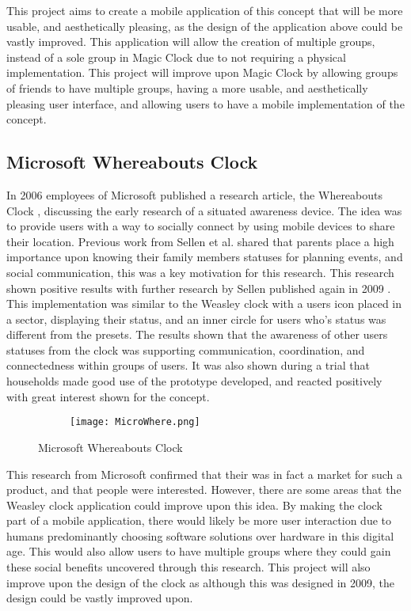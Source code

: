 This project aims to create a mobile application of this concept that will be more usable, and aesthetically pleasing, as the design of the application above could be vastly improved. This application will allow the creation of multiple groups, instead of a sole group in Magic Clock due to not requiring a physical implementation. This project will improve upon Magic Clock by allowing groups of friends to have multiple groups, having a more usable, and aesthetically pleasing user interface, and allowing users to have a mobile implementation of the concept.

\subsection{Microsoft Whereabouts Clock}

In 2006 employees of Microsoft published a research article, the Whereabouts Clock \cite{micrWher}, discussing  the early research of a situated awareness device. The idea was to provide users with a way to socially connect by using mobile devices to share their location. Previous work from Sellen et al. \cite{sellen} shared that parents place a high importance upon knowing their family members statuses for planning events, and social communication, this was a key motivation for this research. This research shown positive results with further research by Sellen published again in 2009 \cite{sellen2009}. This implementation was similar to the Weasley clock with a users icon placed in a sector, displaying their status, and an inner circle for users who's status was different from the presets. The results shown that the awareness of other users statuses from the clock was supporting communication, coordination, and connectedness within groups of users. It was also shown during a trial that households made good use of the prototype developed, and reacted positively with great interest shown for the concept.

\begin{figure}[!htbp]
    \centering
    \begin{subfigure}[b]{0.5\textwidth}
        {\texttt{[image: MicroWhere.png]}}
    \end{subfigure}
    \caption{Microsoft Whereabouts Clock}
    \label{fig:microWhere}
\end{figure}
\FloatBarrier

This research from Microsoft confirmed that their was in fact a market for such a product, and that people were interested. However, there are some areas that the Weasley clock application could improve upon this idea. By making the clock part of a mobile application, there would likely be more user interaction due to humans predominantly choosing software solutions over hardware in this digital age. This would also allow users to have multiple groups where they could gain these social benefits uncovered through this research. This project will also improve upon the design of the clock as although this was designed in 2009, the design could be vastly improved upon. 




